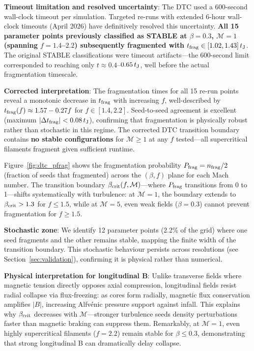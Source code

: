 \documentclass[twocolumn,longtitle,usenatbib]{mnras}
\begin{document}
\textbf{Timeout limitation and resolved uncertainty}: The DTC used a 600-second wall-clock timeout per simulation. Targeted re-runs with extended 6-hour wall-clock timeouts (April 2026) have definitively resolved this uncertainty. \textbf{All 15 parameter points previously classified as STABLE at $\beta = 0.3$, $\mathcal{M} = 1$ (spanning $f = 1.4$--$2.2$) subsequently fragmented with $t_{\rm frag} \in [1.02, 1.43]\,t_{\rm J}$}. The original STABLE classifications were timeout artifacts—the 600-second limit corresponded to reaching only $t \approx 0.4$--$0.65\,t_{\rm J}$, well before the actual fragmentation timescale.

\textbf{Corrected interpretation}: The fragmentation times for all 15 re-run points reveal a monotonic decrease in $t_{\rm frag}$ with increasing $f$, well-described by $t_{\rm frag}(f) \approx 1.57 - 0.27f$ for $f \in [1.4, 2.2]$. Seed-to-seed agreement is excellent (maximum $|\Delta t_{\rm frag}| < 0.08\,t_{\rm J}$), confirming that fragmentation is physically robust rather than stochastic in this regime. The corrected DTC transition boundary contains \textbf{no stable configurations} for $\mathcal{M} \geq 1$ at any $f$ tested—all supercritical filaments fragment given sufficient runtime.

Figure~\ref{fig:dtc_pfrag} shows the fragmentation probability $P_{\rm frag} = n_{\rm frag}/2$ (fraction of seeds that fragmented) across the $(\beta, f)$ plane for each Mach number. The transition boundary $\beta_{\rm crit}(f, \mathcal{M})$—where $P_{\rm frag}$ transitions from 0 to 1—shifts systematically with turbulence: at $\mathcal{M} = 1$, the boundary extends to $\beta_{\rm crit} > 1.3$ for $f \leq 1.5$, while at $\mathcal{M} = 5$, even weak fields ($\beta = 0.3$) cannot prevent fragmentation for $f \geq 1.5$.

\textbf{Stochastic zone}: We identify 12 parameter points (2.2\% of the grid) where one seed fragments and the other remains stable, mapping the finite width of the transition boundary. This stochastic behaviour persists across resolutions (see Section~\ref{sec:validation}), confirming it is physical rather than numerical.

\textbf{Physical interpretation for longitudinal B}: Unlike transverse fields where magnetic tension directly opposes axial compression, longitudinal fields resist radial collapse via flux-freezing: as cores form radially, magnetic flux conservation amplifies $|B|$, increasing Alfv\'enic pressure support against infall. This explains why $\beta_{\rm crit}$ decreases with $\mathcal{M}$---stronger turbulence seeds density perturbations faster than magnetic braking can suppress them. Remarkably, at $\mathcal{M} = 1$, even highly supercritical filaments ($f = 2.2$) remain stable for $\beta \leq 0.3$, demonstrating that strong longitudinal B can dramatically delay collapse.
\end{document}
